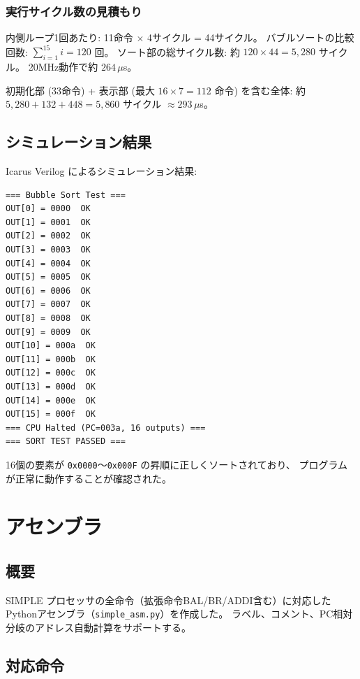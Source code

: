 \documentclass[a4paper,11pt]{ltjsarticle}
\begin{document}
\subsubsection{実行サイクル数の見積もり}

内側ループ1回あたり: 11命令 $\times$ 4サイクル = 44サイクル。
バブルソートの比較回数: $\sum_{i=1}^{15} i = 120$ 回。
ソート部の総サイクル数: 約 $120 \times 44 = 5{,}280$ サイクル。
20MHz動作で約 $264\,\mu$s。

初期化部 (33命令) + 表示部 (最大 $16 \times 7 = 112$ 命令) を含む全体:
約 $5{,}280 + 132 + 448 = 5{,}860$ サイクル $\approx 293\,\mu$s。

\subsection{シミュレーション結果}

Icarus Verilog によるシミュレーション結果:

\begin{lstlisting}[language={},frame=single,caption={バブルソートのシミュレーション出力}]
=== Bubble Sort Test ===
OUT[0] = 0000  OK
OUT[1] = 0001  OK
OUT[2] = 0002  OK
OUT[3] = 0003  OK
OUT[4] = 0004  OK
OUT[5] = 0005  OK
OUT[6] = 0006  OK
OUT[7] = 0007  OK
OUT[8] = 0008  OK
OUT[9] = 0009  OK
OUT[10] = 000a  OK
OUT[11] = 000b  OK
OUT[12] = 000c  OK
OUT[13] = 000d  OK
OUT[14] = 000e  OK
OUT[15] = 000f  OK
=== CPU Halted (PC=003a, 16 outputs) ===
=== SORT TEST PASSED ===
\end{lstlisting}

16個の要素が \texttt{0x0000}〜\texttt{0x000F} の昇順に正しくソートされており、
プログラムが正常に動作することが確認された。


\section{アセンブラ}

\subsection{概要}

SIMPLE プロセッサの全命令（拡張命令BAL/BR/ADDI含む）に対応した
Pythonアセンブラ（\texttt{simple\_asm.py}）を作成した。
ラベル、コメント、PC相対分岐のアドレス自動計算をサポートする。

\subsection{対応命令}
\end{document}
